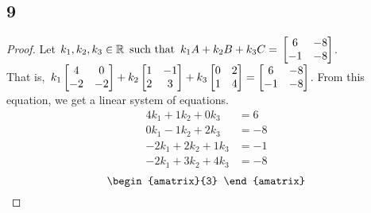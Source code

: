 \subsection*{9}
\begin{enumerate}
  \begin{proof}
    Let $k_1,k_2,k_3 \in \mathbb{R} \operatorname{~\text{such that}~} k_1A + k_2B + k_3C = \operatorname{\displaystyle} \begin{bmatrix} 6 & -8 \\ -1 & -8 \end{bmatrix}$. \\ That is, $\operatorname{\displaystyle} k_1\begin{bmatrix}4  & 0  \\-2 & -2\end{bmatrix} + k_2\begin{bmatrix}1 & -1 \\2 & 3\end{bmatrix} + k_3\begin{bmatrix}0 & 2 \\1 & 4\end{bmatrix} = \begin{bmatrix} 6 & -8 \\ -1 & -8 \end{bmatrix}$. From this equation, we get a linear system of equations.
    \begin{align*}
      4k_1 + 1k_2 + 0k_3  & = 6  \\
      0k_1 - 1k_2 + 2k_3  & = -8 \\
      -2k_1 + 2k_2 + 1k_3 & = -1 \\
      -2k_1 + 3k_2 + 4k_3 & = -8
    \end{align*}
    \[
      \begin{amatrix}{3}

\end{amatrix}\]
\end{proof}
\end{enumerate}
